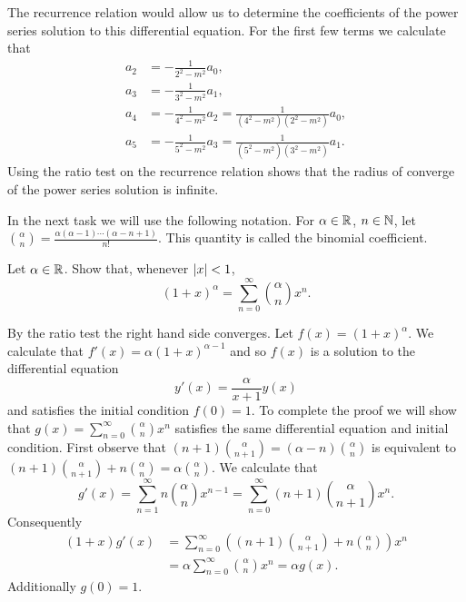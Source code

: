 \begin{solution}
$$    $$
    The recurrence relation would allow us to determine the coefficients of the power series solution to this differential equation.
    For the first few terms we calculate that
    $$
        \begin{aligned}
            a_2 & =  - \frac{1}{2^2 - m^2}a_{0},                                          \\
            a_3 & =  - \frac{1}{3^2 - m^2}a_{1},                                          \\
            a_4 & =  - \frac{1}{4^2 - m^2}a_{2} = \frac{1}{(4^2 - m^2)(2^2 - m^2)} a_{0}, \\
            a_5 & =  - \frac{1}{5^2 - m^2}a_{3} = \frac{1}{(5^2 - m^2)(3^2 - m^2)}a_{1}.
        \end{aligned}
    $$
    Using the ratio test on the recurrence relation shows that the radius of converge of the power series solution is infinite.
\end{solution}


In the next task we will use the following notation.
For \(\alpha \in \mathbb{R}\), \(n\in \mathbb{N}\), let
\(  \binom{\alpha}{n}= \frac{\alpha (\alpha-1) \cdots (\alpha-n+1)}{n!}\).
This quantity is called the binomial coefficient.

\begin{task}
    Let \(\alpha \in \mathbb{R}\).
    Show that, whenever \(\left|x\right|<1\),
    \[
        (1+x)^\alpha = \displaystyle\sum_{n=0}^{\infty} \textstyle\binom{\alpha}{n} x^n.
    \]
\end{task}

\begin{solution}
    By the ratio test the right hand side converges.
    Let \(f(x) = (1+x)^\alpha\).
    We calculate that \(f'(x) = \alpha(1+x)^{\alpha-1}\) and so \(f(x)\) is a solution to the differential equation
    \[
        y'(x) = \frac{\alpha}{x+1}y(x)
    \]
    and satisfies the initial condition \(f(0)=1\).
    To complete the proof we will show that 
    \(g(x) = \sum_{n=0}^{\infty} \binom{\alpha}{n} x^n\) satisfies the same differential equation and initial condition.
    First observe that 
    \( (n+1)\binom{\alpha}{n+1} = (\alpha - n)\binom{\alpha}{n} \) 
    is equivalent to 
    \( (n+1)\binom{\alpha}{n+1} + n \binom{\alpha}{n} = \alpha \binom{\alpha}{n}\).
    We calculate that 
    \[
        g'(x)
        =  \sum_{n=1}^{\infty} n \binom{\alpha}{n} x^{n-1}
        =  \sum_{n=0}^{\infty} (n+1) \binom{\alpha}{n+1} x^n.
    \]
    Consequently
    \[
        \begin{aligned}
            (1+x)g'(x)
             & = \sum_{n=0}^{\infty} \left( (n+1)\binom{\alpha}{n+1} + n\binom{\alpha}{n}    \right)  x^n \\
             & = \alpha  \sum_{n=0}^{\infty} \binom{\alpha}{n}  x^n = \alpha g(x).
        \end{aligned}
    \]
    Additionally \(g(0) = 1\).
\end{solution}


